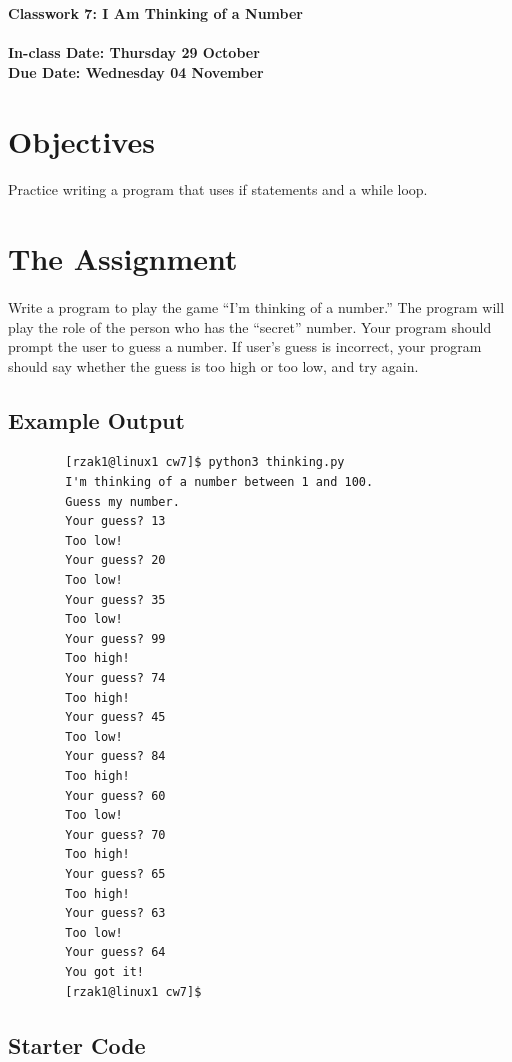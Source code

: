 \documentclass[letter,10pt]{article}
\begin{document}
    
    \huge
    \textbf{Classwork 7: I Am Thinking of a Number}
    \normalsize
    \\ ~~ \\
    \textbf{In-class Date: Thursday 29 October} \\
    \textbf{Due Date: Wednesday 04 November}
    
    \section*{Objectives}
    \paragraph{}Practice writing a program that uses if statements and a while loop.
    
    \section*{The Assignment}
    \paragraph{}Write a program to play the game ``I'm thinking of a number.'' The program will play the role of the person who has the ``secret'' number. Your program should prompt the user to guess a number. If user's guess is incorrect, your program should say whether the guess is too high or too low, and try again.
    
    \subsection*{Example Output}
    \begin{verbatim}
        [rzak1@linux1 cw7]$ python3 thinking.py
        I'm thinking of a number between 1 and 100.
        Guess my number.
        Your guess? 13
        Too low!
        Your guess? 20
        Too low!
        Your guess? 35
        Too low!
        Your guess? 99
        Too high!
        Your guess? 74
        Too high!
        Your guess? 45
        Too low!
        Your guess? 84
        Too high!
        Your guess? 60
        Too low!
        Your guess? 70
        Too high!
        Your guess? 65
        Too high!
        Your guess? 63
        Too low!
        Your guess? 64
        You got it!
        [rzak1@linux1 cw7]$ 
    \end{verbatim}
    
    \subsection*{Starter Code}
\end{document}
